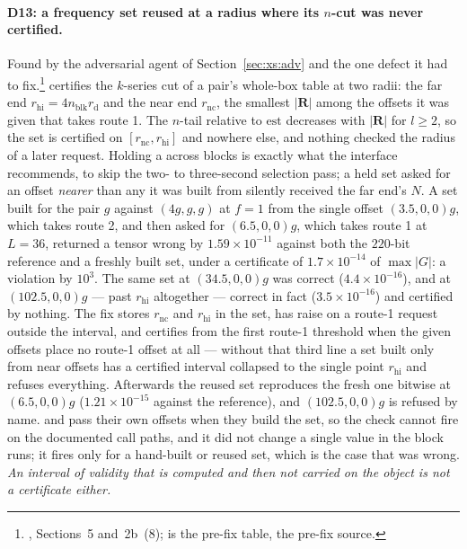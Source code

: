 \paragraph{D13: a frequency set reused at a radius where its $n$-cut was never certified.}
Found by the adversarial agent of Section~\ref{sec:xs:adv} and the one defect it had to
fix.\footnote{, Sections~5 and~2b~(8);
 is the pre-fix table, 
the pre-fix source.}  certifies the $k$-series cut of a pair's whole-box
table at two radii: the far end $r_{\mathrm{hi}} = 4n_{\mathrm{blk}}r_{\mathrm{d}}$ and the
near end $r_{\mathrm{nc}}$, the smallest $|\mathbf{R}|$ among the offsets it was given that
takes route 1. The $n$-tail relative to $\mathrm{est}$ decreases with $|\mathbf{R}|$ for
$l\ge2$, so the set is certified on $[r_{\mathrm{nc}}, r_{\mathrm{hi}}]$ and nowhere else,
and nothing checked the radius of a later request. Holding a  across blocks is
exactly what the interface recommends, to skip the two- to three-second selection pass; a
held set asked for an offset \emph{nearer} than any it was built from silently received the
far end's $N$. A set built for the pair $g$ against $(4g,g,g)$ at $f = 1$ from the single
offset $(3.5,0,0)g$, which takes route 2, and then asked for $(6.5,0,0)g$, which takes
route 1 at $L = 36$, returned a tensor wrong by $1.59\times10^{-11}$ against both the
$220$-bit reference and a freshly built set, under a certificate of $1.7\times10^{-14}$ of
$\max|G|$: a violation by $10^{3}$. The same set at $(34.5,0,0)g$ was correct
($4.4\times10^{-16}$), and at $(102.5,0,0)g$ --- past $r_{\mathrm{hi}}$ altogether ---
correct in fact ($3.5\times10^{-16}$) and certified by nothing. The fix stores
$r_{\mathrm{nc}}$ and $r_{\mathrm{hi}}$ in the set, has  raise on a route-1
request outside the interval, and certifies from the first route-1 threshold when the given
offsets place no route-1 offset at all --- without that third line a set built only from
near offsets has a certified interval collapsed to the single point $r_{\mathrm{hi}}$ and
refuses everything. Afterwards the reused set reproduces the fresh one bitwise at
$(6.5,0,0)g$ ($1.21\times10^{-15}$ against the reference), and $(102.5,0,0)g$ is refused by
name.  and  pass their own offsets when they build the
set, so the check cannot fire on the documented call paths, and it did not change a single
value in the block runs; it fires only for a hand-built or reused set, which is the case
that was wrong. \emph{An interval of validity that is computed and then not carried on the
object is not a certificate either.}


